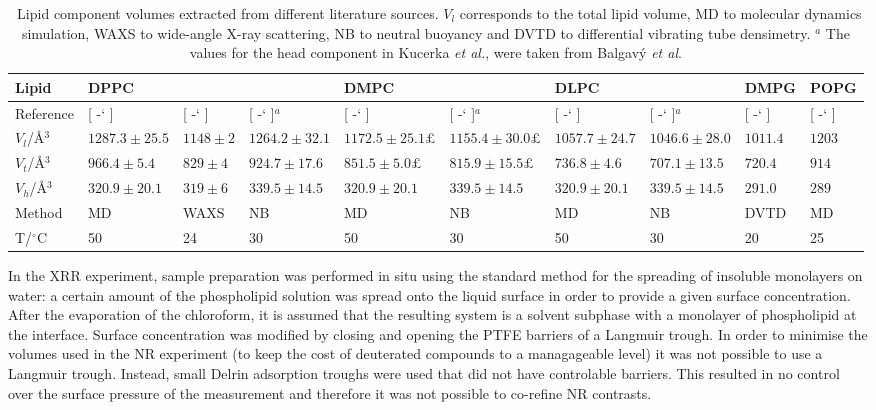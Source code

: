 \documentclass[twoside,twocolumn,9pt]{article}
\newcommand*{\citen}[1]{%
	\begingroup
	\romannumeral-`\x %
	\setcitestyle{numbers}%
	\cite{#1}%
	\endgroup
}
\begin{document}
\begin{table}
	\small
	\caption{\ Lipid component volumes extracted from different literature sources. $V_l$ corresponds to the total lipid volume, MD to molecular dynamics simulation, WAXS to wide-angle X-ray scattering, NB to neutral buoyancy and DVTD to differential vibrating tube densimetry. $^a$ The values for the head component in Kucerka \emph{et al.},\cite{Kucerka2004} were taken from Balgav\'{y} \emph{et al}.\cite{Balgavy2001}}
	\label{tab:water}
	\begin{tabular*}{\textwidth}{@{\extracolsep{\fill}}llllllllll}
		\hline
    Lipid & DPPC & & & DMPC & & DLPC & & DMPG & POPG \\
    \hline
    Reference & [\citen{Armen1998}] & [\citen{Sun1994}] & [\citen{Kucerka2004,Balgavy2001}]$^a$ & [\citen{Armen1998}] & [\citen{Kucerka2004,Balgavy2001}]$^a$ & [\citen{Armen1998}] & [\citen{Kucerka2004,Balgavy2001}]$^a$ & [\citen{Pan2012}] & [\citen{Kucerka2012}] \\
    \hline
    $V_l$/\AA$^3$ & $1287.3\pm25.5$ & $1148\pm2$ & $1264.2\pm32.1$ & $1172.5\pm25.1£$ & $1155.4\pm30.0£$ & $1057.7\pm24.7$ & $1046.6\pm28.0$ & $1011.4$ & $1203$ \\
    $V_t$/\AA$^3$ & $966.4\pm5.4$ & $829\pm4$ & $924.7\pm17.6$ & $851.5\pm5.0£$ & $815.9\pm15.5£$ & $736.8\pm4.6$ & $707.1\pm13.5$ & $720.4$ & $914$ \\
    $V_h$/\AA$^3$ & $320.9\pm20.1$ & $319\pm6$ & $339.5\pm14.5$ & $320.9\pm20.1$ & $339.5\pm14.5$ & $320.9\pm20.1$ & $339.5\pm14.5$ & $291.0$ & $289$ \\
    Method & MD & WAXS & NB & MD & NB & MD & NB & DVTD & MD \\
    T/$^\circ$C & 50 & 24 & 30 & 50 & 30 & 50 & 30 & 20 & 25 \\
	\end{tabular*}
\end{table}
In the XRR experiment, sample preparation was performed in situ using the standard method for the spreading of insoluble monolayers on water: a certain amount of the phospholipid solution was spread onto the liquid surface in order to provide a given surface concentration. After the evaporation of the chloroform, it is assumed that the resulting system is a solvent subphase with a monolayer of phospholipid at the interface. Surface concentration was modified by closing and opening the PTFE barriers of a Langmuir trough. In order to minimise the volumes used in the NR experiment (to keep the cost of deuterated compounds to a managageable level) it was not possible to use a Langmuir trough. Instead, small Delrin adsorption troughs were used that did not have controlable barriers. This resulted in no control over the surface pressure of the measurement and therefore it was not possible to co-refine NR contrasts.
\end{document}
